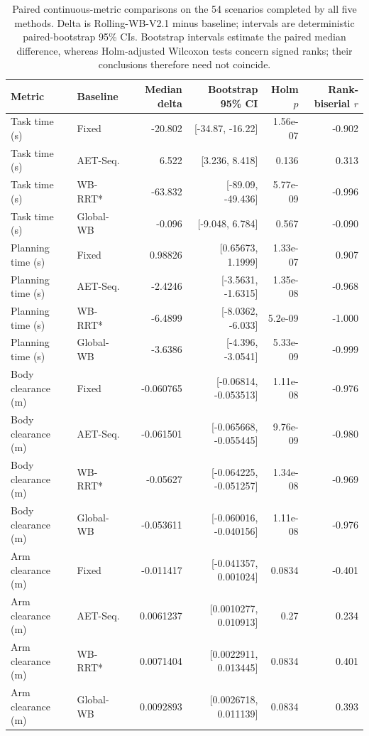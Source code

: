 \begin{table}[t]
\centering
\scriptsize
\caption{Paired continuous-metric comparisons on the 54 scenarios completed by all five methods. Delta is Rolling-WB-V2.1 minus baseline; intervals are deterministic paired-bootstrap 95\% CIs. Bootstrap intervals estimate the paired median difference, whereas Holm-adjusted Wilcoxon tests concern signed ranks; their conclusions therefore need not coincide.}
\label{tab:paired_continuous}
\begin{tabular}{llrrrr}
\toprule
Metric & Baseline & Median delta & Bootstrap 95\% CI & Holm $p$ & Rank-biserial $r$ \\
\midrule
Task time (s) & Fixed & -20.802 & [-34.87, -16.22] & 1.56e-07 & -0.902 \\
Task time (s) & AET-Seq. & 6.522 & [3.236, 8.418] & 0.136 & 0.313 \\
Task time (s) & WB-RRT* & -63.832 & [-89.09, -49.436] & 5.77e-09 & -0.996 \\
Task time (s) & Global-WB & -0.096 & [-9.048, 6.784] & 0.567 & -0.090 \\
\addlinespace
Planning time (s) & Fixed & 0.98826 & [0.65673, 1.1999] & 1.33e-07 & 0.907 \\
Planning time (s) & AET-Seq. & -2.4246 & [-3.5631, -1.6315] & 1.35e-08 & -0.968 \\
Planning time (s) & WB-RRT* & -6.4899 & [-8.0362, -6.033] & 5.2e-09 & -1.000 \\
Planning time (s) & Global-WB & -3.6386 & [-4.396, -3.0541] & 5.33e-09 & -0.999 \\
\addlinespace
Body clearance (m) & Fixed & -0.060765 & [-0.06814, -0.053513] & 1.11e-08 & -0.976 \\
Body clearance (m) & AET-Seq. & -0.061501 & [-0.065668, -0.055445] & 9.76e-09 & -0.980 \\
Body clearance (m) & WB-RRT* & -0.05627 & [-0.064225, -0.051257] & 1.34e-08 & -0.969 \\
Body clearance (m) & Global-WB & -0.053611 & [-0.060016, -0.040156] & 1.11e-08 & -0.976 \\
\addlinespace
Arm clearance (m) & Fixed & -0.011417 & [-0.041357, 0.001024] & 0.0834 & -0.401 \\
Arm clearance (m) & AET-Seq. & 0.0061237 & [0.0010277, 0.010913] & 0.27 & 0.234 \\
Arm clearance (m) & WB-RRT* & 0.0071404 & [0.0022911, 0.013445] & 0.0834 & 0.401 \\
Arm clearance (m) & Global-WB & 0.0092893 & [0.0026718, 0.011139] & 0.0834 & 0.393 \\

\end{tabular}
\end{table}
